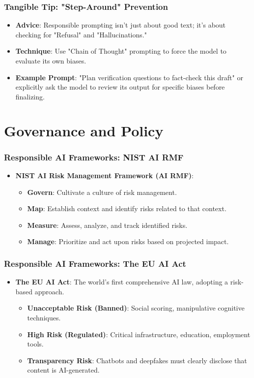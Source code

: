 \documentclass{beamer}
\begin{document}
\begin{frame}
    \frametitle{Tangible Tip: "Step-Around" Prevention}
    \begin{itemize}
        \item \textbf{Advice}: Responsible prompting isn't just about good text; it's about checking for "Refusal" and "Hallucinations."
        \item \textbf{Technique}: Use "Chain of Thought" prompting to force the model to evaluate its own biases.
        \item \textbf{Example Prompt}: "Plan verification questions to fact-check this draft" or explicitly ask the model to review its output for specific biases before finalizing.
    \end{itemize}
\end{frame}

\section{Governance and Policy}

\begin{frame}
    \frametitle{Responsible AI Frameworks: NIST AI RMF}
    \begin{itemize}
        \item \textbf{NIST AI Risk Management Framework (AI RMF)}:
        \begin{itemize}
            \item \textbf{Govern}: Cultivate a culture of risk management.
            \item \textbf{Map}: Establish context and identify risks related to that context.
            \item \textbf{Measure}: Assess, analyze, and track identified risks.
            \item \textbf{Manage}: Prioritize and act upon risks based on projected impact.
        \end{itemize}
    \end{itemize}
\end{frame}

\begin{frame}
    \frametitle{Responsible AI Frameworks: The EU AI Act}
    \begin{itemize}
        \item \textbf{The EU AI Act}: The world’s first comprehensive AI law, adopting a risk-based approach.
        \begin{itemize}
            \item \textbf{Unacceptable Risk (Banned)}: Social scoring, manipulative cognitive techniques.
            \item \textbf{High Risk (Regulated)}: Critical infrastructure, education, employment tools.
            \item \textbf{Transparency Risk}: Chatbots and deepfakes must clearly disclose that content is AI-generated.
        \end{itemize}
    \end{itemize}
\end{frame}
\end{document}
